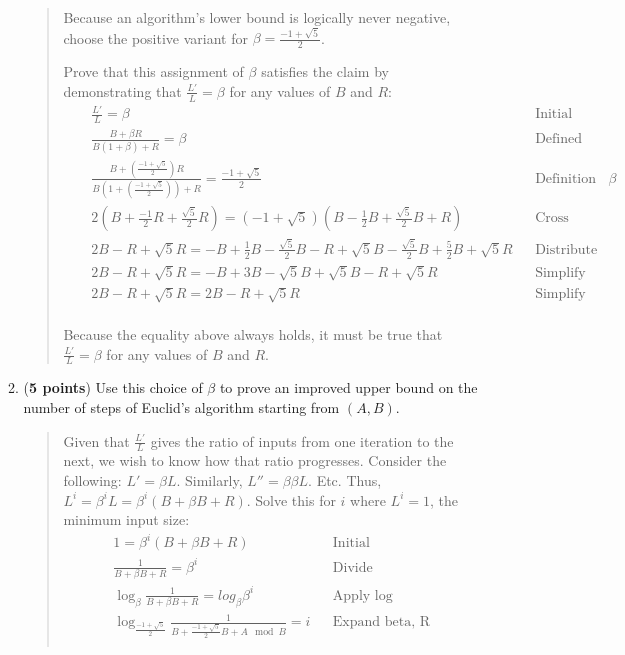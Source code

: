 \documentclass[11pt]{article}
\begin{document}
\begin{enumerate}[leftmargin=*]
\begin{enumerate}
\begin{quote}
      Because an algorithm's lower bound is logically never negative, choose the positive variant for $\beta = \frac{-1 + \sqrt 5}{2}$.

      \medskip
      Prove that this assignment of $\beta$ satisfies the claim by demonstrating that $\frac{L'}{L} = \beta$ for any values of $B$ and $R$: 
      \begin{align*}
          && \frac{L'}{L} = \beta && \text{Initial} && \\
          && \frac{B + \beta R}{B(1 + \beta) + R} = \beta && \text{Defined above} && \\
          && \frac{B + (\frac{-1 + \sqrt 5}{2}) R}{B(1 + (\frac{-1 + \sqrt 5}{2})) + R} = \frac{-1 + \sqrt 5}{2} && \text{Definition of $\beta$} && \\
          && 2(B + \frac{-1}{2}R + \frac{\sqrt 5}{2}R) = (-1 + \sqrt 5)(B - \frac{1}{2}B + \frac{\sqrt 5}{2}B + R) && \text{Cross multiply} && \\
          && 2B - R + \sqrt{5}R = -B + \frac{1}{2}B - \frac{\sqrt 5}{2}B - R + \sqrt{5}B - \frac{\sqrt 5}{2}B + \frac{5}{2}B + \sqrt{5}R && \text{Distribute} && \\
          && 2B - R + \sqrt{5}R = -B + 3B - \sqrt{5}B + \sqrt{5}B - R + \sqrt{5}R && \text{Simplify} && \\
          && 2B - R + \sqrt{5}R = 2B - R + \sqrt{5}R && \text{Simplify} && \\
      \end{align*} 

      Because the equality above always holds, it must be true that $\frac{L'}{L} = \beta$ for any values of $B$ and $R$. 
      \end{quote}
    \item (\textbf{5 points}) Use this choice of $\beta$ to prove an improved upper bound on the number of steps of Euclid's algorithm starting from $(A,B)$.
      \begin{quote}
        \color{purple}
        Given that $\frac{L'}{L}$ gives the ratio of inputs from one iteration to the next, we wish to know how that ratio progresses. Consider the following: $L' = \beta L$. Similarly, $L'' = \beta \beta L$. Etc. Thus, $L^i = \beta^i L = \beta^i(B + \beta B + R)$. Solve this for $i$ where $L^i = 1$, the minimum input size:
      \begin{align*}
          && 1 = \beta^i(B + \beta B + R) && \text{Initial} && \\
          && \frac{1}{B + \beta B + R} = \beta^i && \text{Divide} && \\
          && \log_{\beta}\frac{1}{B + \beta B + R} = log_{\beta} \beta^i && \text{Apply log} && \\
          && \log_{\frac{-1 + \sqrt{5}}{2}}\frac{1}{B + \frac{-1 + \sqrt{5}}{2} B + A \mod B} = i && \text{Expand beta, R} && \\
      \end{align*} 


\end{quote}
\end{enumerate}
\end{enumerate}
\end{document}
